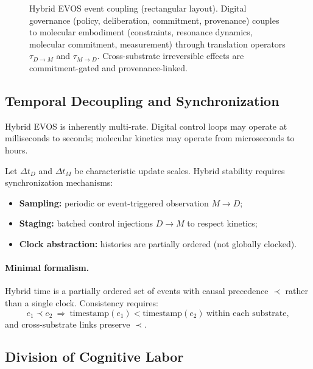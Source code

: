 \documentclass[11pt]{article}
\begin{document}
\begin{figure}[t]
\caption{Hybrid EVOS event coupling (rectangular layout). Digital governance (policy, deliberation, commitment, provenance) couples to molecular embodiment (constraints, resonance dynamics, molecular commitment, measurement) through translation operators $\tau_{D\rightarrow M}$ and $\tau_{M\rightarrow D}$. Cross-substrate irreversible effects are commitment-gated and provenance-linked.}
\label{fig:hybrid-evos-coupling}
\end{figure}


\subsection{Temporal Decoupling and Synchronization}
\label{sec:temporal-decoupling}

Hybrid EVOS is inherently multi-rate. Digital control loops may operate at milliseconds to
seconds; molecular kinetics may operate from microseconds to hours.

Let $\Delta t_D$ and $\Delta t_M$ be characteristic update scales. Hybrid stability
requires synchronization mechanisms:
\begin{itemize}
  \item \textbf{Sampling:} periodic or event-triggered observation $M\rightarrow D$;
  \item \textbf{Staging:} batched control injections $D\rightarrow M$ to respect kinetics;
  \item \textbf{Clock abstraction:} histories are partially ordered (not globally clocked).
\end{itemize}

\paragraph{Minimal formalism.}
Hybrid time is a partially ordered set of events with causal precedence $\prec$ rather than a single clock.
Consistency requires:
\[
e_1 \prec e_2 \ \Rightarrow\ \text{timestamp}(e_1) < \text{timestamp}(e_2)\ \text{within each substrate},
\]
and cross-substrate links preserve $\prec$.

\subsection{Division of Cognitive Labor}
\label{sec:cognitive-labor}
\end{document}
